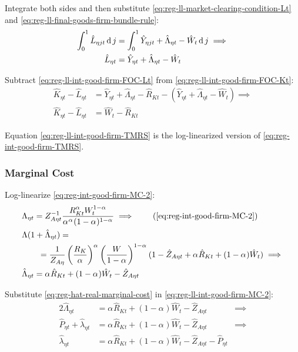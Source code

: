 \documentclass[../thesis.tex]{subfiles}
\begin{document}
Integrate both sides and then substitute \ref{eq:reg-ll-market-clearing-condition-Lt} and \ref{eq:reg-ll-final-goods-firm-bundle-rule}:
\begin{align}
	\int_{0}^{1} \hat{L}_{\eta jt} \operatorname{d} j &= \int_{0}^{1} \hat{Y}_{\eta jt} + \hat{\Lambda}_{\eta t} - \hat{W}_{t} \operatorname{d} j \implies \nonumber \\
	\hat{L}_{\eta t} &= \hat{Y}_{\eta t} + \hat{\Lambda}_{\eta t} - \hat{W}_{t}
	\label{eq:reg-ll-int-good-firm-FOC-Lt}
\end{align}

Subtract \ref{eq:reg-ll-int-good-firm-FOC-Lt} from \ref{eq:reg-ll-int-good-firm-FOC-Kt}:
\begin{align}
	\hat{K}_{\eta t} - \hat{L}_{\eta t} &= \hat{Y}_{\eta t} + \hat{\Lambda}_{\eta t} - \hat{R}_{K t} - (\hat{Y}_{\eta t} + \hat{\Lambda}_{\eta t} - \hat{W}_{t}) \implies \nonumber \\
	\hat{K}_{\eta t} - \hat{L}_{\eta t} &= \hat{W}_{t} - \hat{R}_{K t} \label{eq:reg-ll-int-good-firm-TMRS}
\end{align}

Equation \ref{eq:reg-ll-int-good-firm-TMRS} is the log-linearized version of \ref{eq:reg-int-good-firm-TMRS}.


\subsubsection*{Marginal Cost}

Log-linearize \ref{eq:reg-int-good-firm-MC-2}:
\begin{alignat}{2}
	& \Lambda_{\eta t} = Z_{A\eta t}^{-1} \frac{R_{Kt}^{{\alpha_{}}} W_t^{1-{\alpha_{}}}}{{\alpha_{}}^{{\alpha_{}}} (1-{\alpha_{}})^{1-{\alpha_{}}}} \implies \tag{\ref{eq:reg-int-good-firm-MC-2}} \\
	& \Lambda (1+ \hat{\Lambda}_{\eta t}) = \nonumber \\ & \qquad = \frac{1}{Z_{A\eta}} \left( \frac{R_{K}}{{\alpha_{}}} \right)^{{\alpha_{}}} \left( \frac{W}{1-{\alpha_{}}} \right)^{1-{\alpha_{}}} (1- \hat{Z}_{A\eta t} + {\alpha_{}} \hat{R}_{Kt} + (1- {\alpha_{}}) \hat{W}_{t} ) \implies \nonumber \\
	& \hat{\Lambda}_{\eta t} = {\alpha_{}} \hat{R}_{Kt} + (1- {\alpha_{}}) \hat{W}_{t} - \hat{Z}_{A\eta t} \label{eq:reg-ll-int-good-firm-MC-2}
\end{alignat}

Substitute \ref{eq:reg-hat-real-marginal-cost} in \ref{eq:reg-ll-int-good-firm-MC-2}:
\begin{alignat}{2}
	\hat{\Lambda}_{\eta t} &= {\alpha_{}} \hat{R}_{Kt} + (1- {\alpha_{}}) \hat{W}_{t} - \hat{Z}_{A\eta t} &\implies \nonumber \\
	\hat{P}_{\eta t} + \hat{\lambda}_{\eta t} &= {\alpha_{}} \hat{R}_{Kt} + (1- {\alpha_{}}) \hat{W}_{t} - \hat{Z}_{A\eta t} &\implies \nonumber \\
	\hat{\lambda}_{\eta t} &= {\alpha_{}} \hat{R}_{Kt} + (1- {\alpha_{}}) \hat{W}_{t} - \hat{Z}_{A\eta t} - \hat{P}_{\eta t} \label{eq:reg-ll-int-good-firm-MC-3}
\end{alignat}
\end{document}
